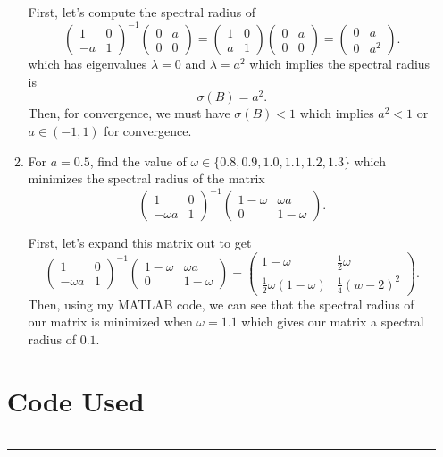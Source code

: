 \documentclass[a4paper,12pt]{article}
\newcommand{\pmat}[1]{\begin{pmatrix} #1 \end{pmatrix}}
\begin{document}
\begin{enumerate}[label = \arabic*.]
\begin{enumerate}[label = (\alph*)]
		First, let's compute the spectral radius of
		\[
			\pmat{ 1& 0 \\ -a & 1}^{-1} \pmat{0 & a \\ 0 & 0} = \pmat{ 1& 0 \\ a & 1} \pmat{0 & a \\ 0 & 0} = \pmat{0 & a \\ 0 & a^2}.
		\]
		which has eigenvalues $ \lambda = 0 $ and $ \lambda = a^2 $ which implies the spectral radius is
		\[
			\sigma(B) = a^2.
		\]
		Then, for convergence, we must have $ \sigma(B) < 1 $ which implies $ a^2 < 1 $ or $ a \in (-1, 1) $ for convergence.
		
		\item For $ a = 0.5 $, find the value of $ \omega \in \{0.8, 0.9, 1.0, 1.1, 1.2, 1.3\} $ which minimizes the spectral radius of the matrix
		\[
			\pmat{1 & 0 \\ -\omega a & 1}^{-1} \pmat{1- \omega & \omega a \\ 0 & 1- \omega}.
		\]
		
		First, let's expand this matrix out to get
		\[
			\pmat{1 & 0 \\ -\omega a & 1}^{-1} \pmat{1- \omega & \omega a \\ 0 & 1- \omega} = \pmat{1 - \omega & \frac{1}{2}\omega \\ \frac{1}{2} \omega (1 - \omega) & \frac{1}{4} (w - 2)^2}.
		\]
		Then, using my MATLAB code, we can see that the spectral radius of our matrix is minimized when $ \omega = 1.1 $ which gives our matrix a spectral radius of $ 0.1 $.
	\end{enumerate}

\newpage
\section*{Code Used}
	\rule{\textwidth}{0.4pt}
	
	\rule{\textwidth}{0.4pt}
\end{enumerate}
\end{document}
